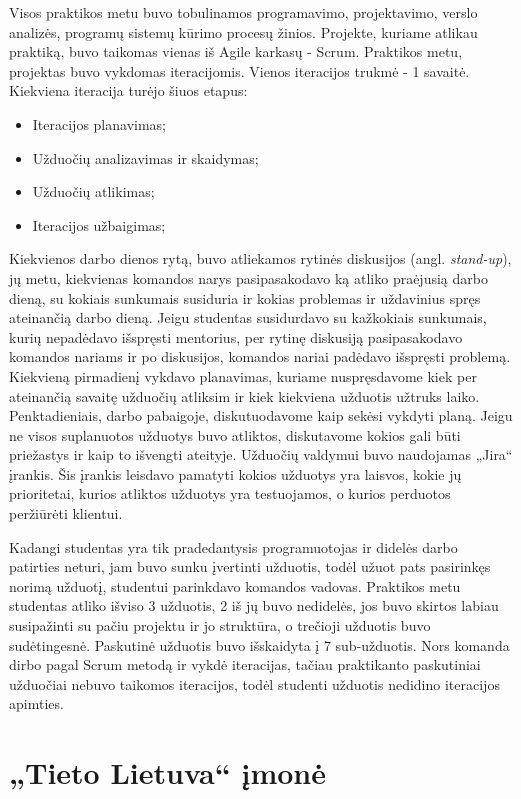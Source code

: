 \documentclass{VUMIFPSbakalaurinis}
\begin{document}
Visos praktikos metu buvo tobulinamos programavimo, projektavimo, verslo analizės, programų sistemų kūrimo procesų žinios. Projekte, kuriame atlikau praktiką, buvo taikomas vienas iš Agile karkasų - Scrum. Praktikos metu, projektas buvo vykdomas iteracijomis. Vienos iteracijos trukmė - 1 savaitė. Kiekviena iteracija turėjo šiuos etapus:
\begin{itemize}
    \item Iteracijos planavimas;
    \item Užduočių analizavimas ir skaidymas;
    \item Užduočių atlikimas;
    \item Iteracijos užbaigimas;
\end{itemize}
Kiekvienos darbo dienos rytą, buvo atliekamos rytinės diskusijos (angl. \textit{stand-up}), jų metu, kiekvienas komandos narys pasipasakodavo ką atliko praėjusią darbo dieną, su kokiais sunkumais susiduria ir kokias problemas ir uždavinius spręs ateinančią darbo dieną. Jeigu studentas susidurdavo su kažkokiais sunkumais, kurių nepadėdavo išspręsti mentorius, per rytinę diskusiją pasipasakodavo komandos nariams ir po diskusijos, komandos nariai padėdavo išspręsti problemą. Kiekvieną pirmadienį vykdavo planavimas, kuriame nuspręsdavome kiek per ateinančią savaitę užduočių atliksim ir kiek kiekviena užduotis užtruks laiko. Penktadieniais, darbo pabaigoje, diskutuodavome kaip sekėsi vykdyti planą. Jeigu ne visos suplanuotos užduotys buvo atliktos, diskutavome kokios gali būti priežastys ir kaip to išvengti ateityje. Užduočių valdymui buvo naudojamas „Jira“ įrankis. Šis įrankis leisdavo pamatyti kokios užduotys yra laisvos, kokie jų prioritetai, kurios atliktos užduotys yra testuojamos, o kurios perduotos peržiūrėti klientui.


Kadangi studentas yra tik pradedantysis programuotojas ir didelės darbo patirties neturi, jam buvo sunku įvertinti užduotis, todėl užuot pats pasirinkęs norimą užduotį, studentui parinkdavo komandos vadovas. Praktikos metu studentas atliko išviso 3 užduotis, 2 iš jų buvo nedidelės, jos buvo skirtos labiau susipažinti su pačiu projektu ir jo struktūra, o trečioji užduotis buvo sudėtingesnė. Paskutinė užduotis buvo išskaidyta į 7 sub-užduotis. Nors komanda dirbo pagal Scrum metodą ir vykdė iteracijas, tačiau praktikanto paskutiniai užduočiai nebuvo taikomos iteracijos, todėl studenti užduotis nedidino iteracijos apimties.

\section{„Tieto Lietuva“ įmonė}
\end{document}
